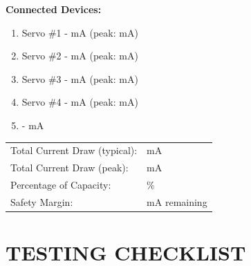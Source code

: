 \documentclass[10pt,letterpaper]{article}
\begin{document}
\textbf{Connected Devices:}
\begin{enumerate}[nosep]
\item Servo \#1 - \underline{\hspace{2cm}} mA (peak: \underline{\hspace{2cm}} mA)
\item Servo \#2 - \underline{\hspace{2cm}} mA (peak: \underline{\hspace{2cm}} mA)
\item Servo \#3 - \underline{\hspace{2cm}} mA (peak: \underline{\hspace{2cm}} mA)
\item Servo \#4 - \underline{\hspace{2cm}} mA (peak: \underline{\hspace{2cm}} mA)
\item \underline{\hspace{3cm}} - \underline{\hspace{2cm}} mA
\end{enumerate}

\begin{tabularx}{\textwidth}{lX}
Total Current Draw (typical): & \underline{\hspace{3cm}} mA \\
Total Current Draw (peak): & \underline{\hspace{3cm}} mA \\
Percentage of Capacity: & \underline{\hspace{3cm}} \% \\
Safety Margin: & \underline{\hspace{3cm}} mA remaining \\
\end{tabularx}

\section*{TESTING CHECKLIST}
\end{document}
